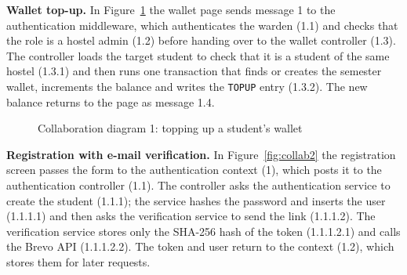 \documentclass[11pt,a4paper]{article}
\begin{document}
\textbf{Wallet top-up.} In Figure~\ref{fig:collab1} the wallet page sends message
1 to the authentication middleware, which authenticates the warden (1.1) and
checks that the role is a hostel admin (1.2) before handing over to the wallet
controller (1.3). The controller loads the target student to check that it is a
student of the same hostel (1.3.1) and then runs one transaction that finds or
creates the semester wallet, increments the balance and writes the
\texttt{TOPUP} entry (1.3.2). The new balance returns to the page as message 1.4.

\begin{figure}[H]
\centering
{}
\caption{Collaboration diagram 1: topping up a student's wallet}
\label{fig:collab1}
\end{figure}

\textbf{Registration with e-mail verification.} In Figure~\ref{fig:collab2} the
registration screen passes the form to the authentication context (1), which
posts it to the authentication controller (1.1). The controller asks the
authentication service to create the student (1.1.1); the service hashes the
password and inserts the user (1.1.1.1) and then asks the verification service
to send the link (1.1.1.2). The verification service stores only the SHA-256
hash of the token (1.1.1.2.1) and calls the Brevo API (1.1.1.2.2). The token and
user return to the context (1.2), which stores them for later requests.
\end{document}
